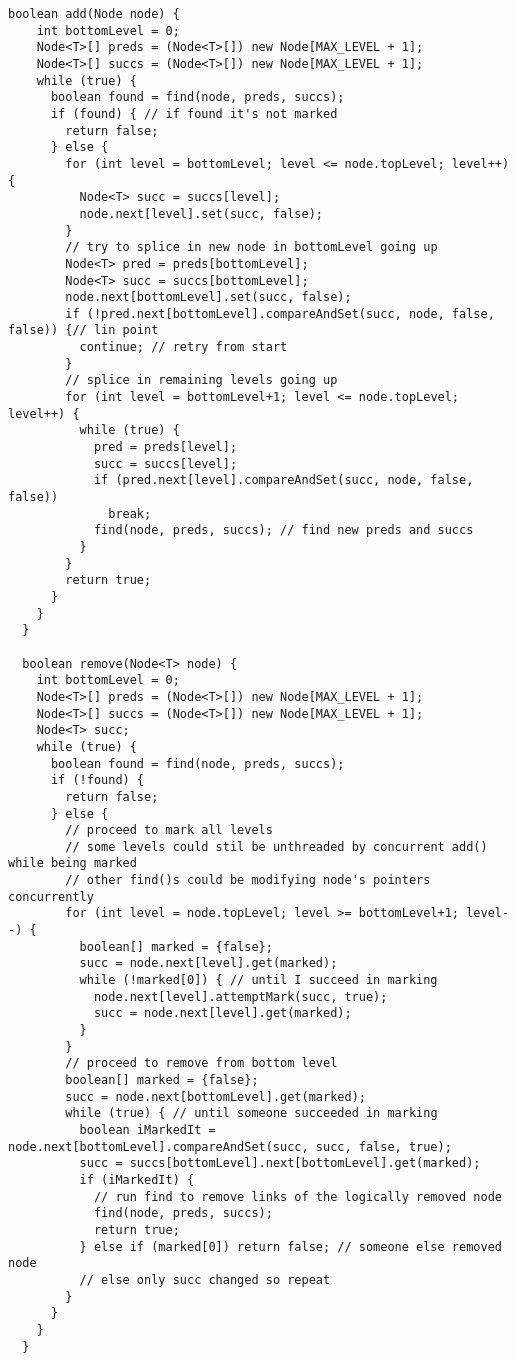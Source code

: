 \begin{lstlisting}[frame=single,breaklines=true]
  boolean add(Node node) {
    int bottomLevel = 0;
    Node<T>[] preds = (Node<T>[]) new Node[MAX_LEVEL + 1];
    Node<T>[] succs = (Node<T>[]) new Node[MAX_LEVEL + 1];
    while (true) {
      boolean found = find(node, preds, succs);
      if (found) { // if found it's not marked
        return false;
      } else {
        for (int level = bottomLevel; level <= node.topLevel; level++) {
          Node<T> succ = succs[level];
          node.next[level].set(succ, false);
        }
        // try to splice in new node in bottomLevel going up
        Node<T> pred = preds[bottomLevel];
        Node<T> succ = succs[bottomLevel];
        node.next[bottomLevel].set(succ, false);
        if (!pred.next[bottomLevel].compareAndSet(succ, node, false, false)) {// lin point
          continue; // retry from start
        }
        // splice in remaining levels going up
        for (int level = bottomLevel+1; level <= node.topLevel; level++) {
          while (true) {
            pred = preds[level];
            succ = succs[level];
            if (pred.next[level].compareAndSet(succ, node, false, false))
              break;
            find(node, preds, succs); // find new preds and succs
          }
        }
        return true;
      }
    }
  }
  
  boolean remove(Node<T> node) {
    int bottomLevel = 0;
    Node<T>[] preds = (Node<T>[]) new Node[MAX_LEVEL + 1];
    Node<T>[] succs = (Node<T>[]) new Node[MAX_LEVEL + 1];
    Node<T> succ;
    while (true) {
      boolean found = find(node, preds, succs);
      if (!found) { 
        return false;
      } else {
        // proceed to mark all levels
        // some levels could stil be unthreaded by concurrent add() while being marked
        // other find()s could be modifying node's pointers concurrently
        for (int level = node.topLevel; level >= bottomLevel+1; level--) {
          boolean[] marked = {false};
          succ = node.next[level].get(marked);
          while (!marked[0]) { // until I succeed in marking
            node.next[level].attemptMark(succ, true);
            succ = node.next[level].get(marked);
          }
        }
        // proceed to remove from bottom level
        boolean[] marked = {false};
        succ = node.next[bottomLevel].get(marked);
        while (true) { // until someone succeeded in marking
          boolean iMarkedIt = node.next[bottomLevel].compareAndSet(succ, succ, false, true);
          succ = succs[bottomLevel].next[bottomLevel].get(marked);
          if (iMarkedIt) {
            // run find to remove links of the logically removed node
            find(node, preds, succs);
            return true;
          } else if (marked[0]) return false; // someone else removed node
          // else only succ changed so repeat
        }
      }
    }
  }
\end{lstlisting}



